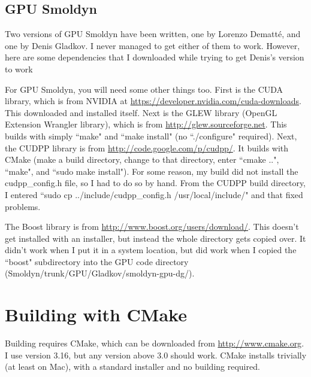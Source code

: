 \documentclass {book}
\begin{document}
\subsection{GPU Smoldyn}

Two versions of GPU Smoldyn have been written, one by Lorenzo Dematt\'{e}, and one by Denis Gladkov. I never managed to get either of them to work. However, here are some dependencies that I downloaded while trying to get Denis's version to work

For GPU Smoldyn, you will need some other things too. First is the CUDA library, which is from NVIDIA at \url{https://developer.nvidia.com/cuda-downloads}. This downloaded and installed itself. Next is the GLEW library (OpenGL Extension Wrangler library), which is from \url{http://glew.sourceforge.net}. This builds with simply ``make" and ``make install" (no ``./configure" required). Next, the CUDPP library is from \url{http://code.google.com/p/cudpp/}. It builds with CMake (make a build directory, change to that directory, enter ``cmake ..", ``make", and ``sudo make install"). For some reason, my build did not install the cudpp\_config.h file, so I had to do so by hand. From the CUDPP build directory, I entered ``sudo cp ../include/cudpp\_config.h /usr/local/include/" and that fixed problems.

The Boost library is from \url{http://www.boost.org/users/download/}. This doesn't get installed with an installer, but instead the whole directory gets copied over. It didn't work when I put it in a system location, but did work when I copied the ``boost" subdirectory into the GPU code directory (Smoldyn/trunk/GPU/Gladkov/smoldyn-gpu-dg/).

\section{Building with CMake}

Building requires CMake, which can be downloaded from \url{http://www.cmake.org}. I use version 3.16, but any version above 3.0 should work. CMake installs trivially (at least on Mac), with a standard installer and no building required.
\end{document}
